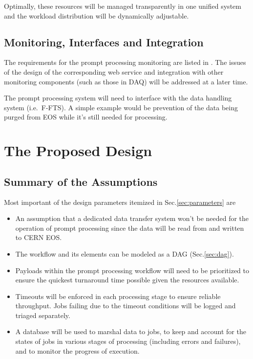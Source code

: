 \documentclass[pdftex,12pt,letter]{article}
\begin{document}
\noindent Optimally, these resources will be managed transparently in one unified system and the workload
distribution will be dynamically adjustable.

\subsection{Monitoring, Interfaces and Integration}
The requirements for the prompt processing monitoring are listed in \cite{docdb1811}.
The issues of the design of the corresponding web service and integration with other monitoring
components (such as those in DAQ) will be addressed at a later time.

The prompt processing system will need to interface with the data handling system (i.e.~F-FTS). A simple example
would be prevention of the data being purged from EOS while it's still needed for processing.

\section{The Proposed Design}
\label{sec:design}
\subsection{Summary of the Assumptions}
Most important of the design parameters itemized in Sec.\ref{sec:parameters} are

\begin{itemize}

\item An assumption that a dedicated data transfer system won't be needed for the
operation of prompt processing since the data will be read from and written to CERN EOS.

\item The workflow and its elements can be modeled as a DAG (Sec.\ref{sec:dag}).

\item Payloads within the prompt processing workflow will need to be prioritized to ensure
the quickest turnaround time possible given the resources available.

\item Timeouts will be enforced in each processing stage to ensure reliable throughput. Jobs
failing due to the timeout conditions will be logged and triaged separately.

\item A database will be used to marshal data to jobs, to keep and account for the states
of jobs in various stages of processing (including errors and failures),
and to monitor the progress of execution.

\end{itemize}
\end{document}
